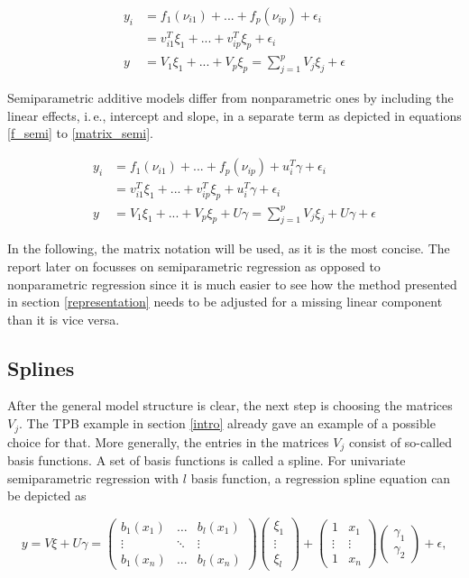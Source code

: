 \documentclass[12pt]{article}
\begin{document}
\begin{align}
y_i &= f_1(\nu_{i1}) + ... + f_p(\nu_{ip})+\epsilon_i \label{f}\\
&=  v^T_{i1}\xi_1 + ... + v^T_{ip}\xi_p+\epsilon_i \label{vector} \\
y &= V_1\xi_1 + ... + V_p\xi_p = \sum_{j=1}^p V_j\xi_j +\epsilon \label{matrix}
\end{align}

Semiparametric additive models differ from nonparametric ones by including the linear effects, i.\,e., intercept and slope, in a separate term as depicted in equations \ref{f_semi} to \ref{matrix_semi}.

\begin{align}
y_i &= f_1(\nu_{i1}) + ... + f_p(\nu_{ip})+ u^T_i\gamma+\epsilon_i\label{f_semi}\\
&=  v^T_{i1}\xi_1 + ... + v^T_{ip}\xi_p+ u^T_i\gamma+\epsilon_i\label{vector_semi} \\
y&= V_1\xi_1 + ... + V_p\xi_p + U\gamma= \sum_{j=1}^p V_j\xi_j + U\gamma+\epsilon\label{matrix_semi}
\end{align}

In the following, the matrix notation will be used, as it is the most concise.
The report later on focusses on semiparametric regression as opposed to nonparametric regression since it is much easier to see how the method presented in section \ref{representation} needs to be adjusted for a missing linear component than it is vice versa.

\subsection{Splines}

After the general model structure is clear, the next step is choosing the matrices $V_j$.
The TPB example in section \ref{intro} already gave an example of a possible choice for that. More generally, the entries in the matrices $V_j$ consist of so-called basis functions. A set of basis functions is called a spline. For univariate semiparametric regression with $l$ basis function, a regression spline equation can be depicted as   

$$y = V\xi + U\gamma 
= \begin{pmatrix}
b_1(x_1) & \dots & b_l(x_1) \\
 \vdots  & \ddots & \vdots \\
b_1(x_n) & ... & b_l(x_n)
\end{pmatrix} 
\begin{pmatrix}
\xi_1 \\
 \vdots   \\
\xi_l 
\end{pmatrix} 
+ 
\begin{pmatrix}
1 &  x_1 \\
 \vdots & \vdots \\
1 & x_n
\end{pmatrix} 
\begin{pmatrix}
\gamma_1 \\
\gamma_2 
\end{pmatrix} +\epsilon,
$$
\end{document}
